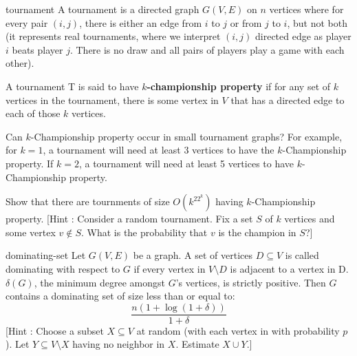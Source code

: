 \begin{exercise-prob}
\begin{show-ps2}{tournament}
A tournament is a directed graph $G(V,E)$ on $n$ vertices where for every pair $(i,j)$, there is either an edge from $i$ to $j$ or from $j$ to $i$, but not both (it represents real tournaments, where we interpret $(i,j)$ directed edge as player $i$ beats player $j$. There is no draw and all pairs of players play a game with each other). 

A tournament T is said to have \textbf{$k$-championship property} if for any set of $k$ vertices in the tournament, there is some vertex in $V$ that has a directed edge to each of those $k$ vertices.

Can $k$-Championship property occur in small tournament graphs? For example, for $k=1$, a tournament will need at least $3$ vertices to have the $k$-Championship property. If $k=2$, a tournament will need at least 5 vertices to have $k$-Championship property.

Show that there are tournments of size $O(k^22^k)$ having $k$-Championship property. [Hint : Consider a random tournament. Fix a set $S$ of $k$ vertices and some vertex $v \notin S$. What is the probability that $v$ is the champion in $S$?]
\end{show-ps2}
\end{exercise-prob}

\begin{exercise-prob}
\begin{show-ps2}{dominating-set}
Let $G(V,E)$ be a graph. A set of vertices $D \subseteq V$ is called dominating
with respect to $G$ if every vertex in $V \setminus D$ is adjacent to a vertex in D. $\delta(G)$, the minimum degree amongst $G$’s vertices, is strictly positive. Then $G$ contains a dominating set of size less than or equal to:
$$ \frac{n(1+\log(1+\delta))}{1+\delta} $$
[Hint : Choose a subset $X\subseteq V$ at random (with each vertex in with probability $p$). Let $Y \subseteq V\setminus X$ having no neighbor in $X$. Estimate $X \cup Y$.]
\end{show-ps2}
\end{exercise-prob}
